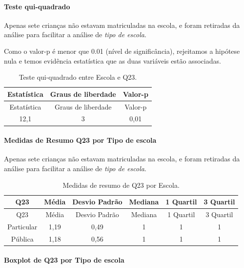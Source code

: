 \documentclass[]{article}
\let\oldparagraph\paragraph
\renewcommand{\paragraph}[1]{\oldparagraph{#1}\mbox{}}
\begin{document}
\hypertarget{teste-qui-quadrado-51}{%
\paragraph{Teste qui-quadrado}\label{teste-qui-quadrado-51}}

Apenas sete crianças não estavam matriculadas na escola, e foram retiradas da análise para facilitar a análise de \emph{tipo de escola}.

Como o valor-p é menor que 0.01 (nível de significância), rejeitamos a hipótese nula e temos evidência estatística que as duas variáveis estão associadas.

\begin{longtable}[]{@{}ccc@{}}
\caption{\label{tab:unnamed-chunk-586}Teste qui-quadrado entre Escola e Q23.}\tabularnewline
\toprule
Estatística & Graus de liberdade & Valor-p\tabularnewline
\midrule
\endfirsthead
\toprule
Estatística & Graus de liberdade & Valor-p\tabularnewline
\midrule
\endhead
12,1 & 3 & 0,01\tabularnewline
\bottomrule
\end{longtable}

\cleardoublepage

\hypertarget{medidas-de-resumo-q23-por-tipo-de-escola}{%
\paragraph{Medidas de Resumo Q23 por Tipo de escola}\label{medidas-de-resumo-q23-por-tipo-de-escola}}

Apenas sete crianças não estavam matriculadas na escola, e foram retiradas da análise para facilitar a análise de \emph{tipo de escola}.

\begin{longtable}[]{@{}cccccc@{}}
\caption{\label{tab:unnamed-chunk-587}Medidas de resumo de Q23 por Escola.}\tabularnewline
\toprule
Q23 & Média & Desvio Padrão & Mediana & 1 Quartil & 3 Quartil\tabularnewline
\midrule
\endfirsthead
\toprule
Q23 & Média & Desvio Padrão & Mediana & 1 Quartil & 3 Quartil\tabularnewline
\midrule
\endhead
Particular & 1,19 & 0,49 & 1 & 1 & 1\tabularnewline
Pública & 1,18 & 0,56 & 1 & 1 & 1\tabularnewline
\bottomrule
\end{longtable}

\hypertarget{boxplot-de-q23-por-tipo-de-escola}{%
\paragraph{Boxplot de Q23 por Tipo de escola}\label{boxplot-de-q23-por-tipo-de-escola}}
\end{document}
